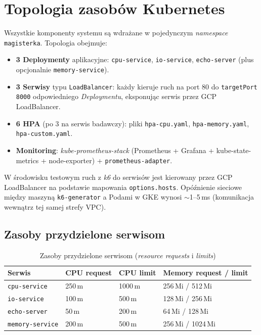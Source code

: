 \section{Topologia zasobów Kubernetes}

Wszystkie komponenty systemu są wdrażane w pojedynczym \textit{namespace} \texttt{magisterka}. Topologia obejmuje:

\begin{itemize}
  \item \textbf{3 Deploymenty} aplikacyjne: \texttt{cpu-service}, \texttt{io-service}, \texttt{echo-server} (plus opcjonalnie \texttt{memory-service}).
  \item \textbf{3 Serwisy} typu \texttt{LoadBalancer}: każdy kieruje ruch na port 80 do \texttt{targetPort 8000} odpowiedniego \textit{Deploymentu}, eksponując serwis przez GCP LoadBalancer.
  \item \textbf{6 HPA} (po 3 na serwis badawczy): pliki \texttt{hpa-cpu.yaml}, \texttt{hpa-memory.yaml}, \texttt{hpa-custom.yaml}.
  \item \textbf{Monitoring}: \textit{kube-prometheus-stack} (Prometheus + Grafana + kube-state-metrics + node-exporter) + \texttt{prometheus-adapter}.
\end{itemize}

W środowisku testowym ruch z \textit{k6} do serwisów jest kierowany przez GCP LoadBalancer na podstawie mapowania \texttt{options.hosts}. Opóźnienie sieciowe między maszyną \texttt{k6-generator} a Podami w GKE wynosi $\sim$1--5\,ms (komunikacja wewnątrz tej samej strefy VPC).

\subsection{Zasoby przydzielone serwisom}

\begin{table}[H]
  \centering
  \begin{tabularx}{\textwidth}{|l|X|X|X|}
    \hline
    \textbf{Serwis} & \textbf{CPU request} & \textbf{CPU limit} & \textbf{Memory request / limit} \\
    \hline
    \texttt{cpu-service} & 250\,m & 1000\,m & 256\,Mi / 512\,Mi \\
    \texttt{io-service} & 100\,m & 500\,m & 128\,Mi / 256\,Mi \\
    \texttt{echo-server} & 50\,m & 200\,m & 64\,Mi / 128\,Mi \\
    \texttt{memory-service} & 200\,m & 500\,m & 256\,Mi / 1024\,Mi \\
    \hline
  \end{tabularx}
  \caption{Zasoby przydzielone serwisom (\textit{resource requests} i \textit{limits})}
  \label{tab:resource-allocation}
\end{table}

